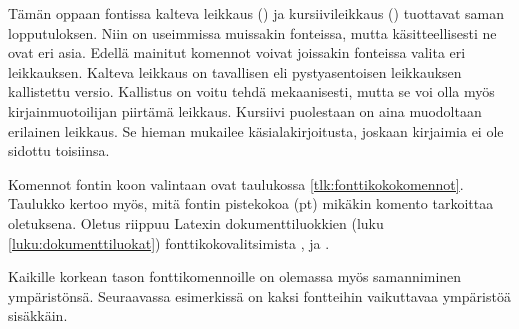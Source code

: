 Tämän oppaan fontissa kalteva leikkaus () ja
kursiivileikkaus () tuottavat saman
lopputuloksen. Niin on useimmissa muissakin fonteissa, mutta
käsitteellisesti ne ovat eri asia. Edellä mainitut komennot voivat
joissakin fonteissa valita eri leikkauksen. Kalteva leikkaus on
tavallisen eli pys\-ty\-asen\-toi\-sen leikkauksen kallistettu versio.
Kallistus on voitu tehdä mekaanisesti, mutta se voi olla myös
kirjainmuotoilijan piirtämä leikkaus. Kursiivi puolestaan on aina
muodoltaan erilainen leikkaus. Se hieman mukailee
käsi\-ala\-kir\-joi\-tusta, joskaan kirjaimia ei ole sidottu toisiinsa.

Komennot fontin koon valintaan ovat taulukossa
\ref{tlk:fonttikokokomennot}. Taulukko kertoo myös, mitä fontin
pistekokoa (pt) mikäkin komento tarkoittaa oletuksena. Oletus riippuu
Latexin dokumenttiluokkien (luku \ref{luku:dokumenttiluokat})
fonttikokovalitsimista \koodi{10pt}, \koodi{11pt} ja \koodi{12pt}.


\pagebreak[3]

Kaikille korkean tason fonttikomennoille on olemassa myös samanniminen
ympäristönsä. Seuraavassa esimerkissä on kaksi fontteihin vaikuttavaa
ympäristöä sisäkkäin.

